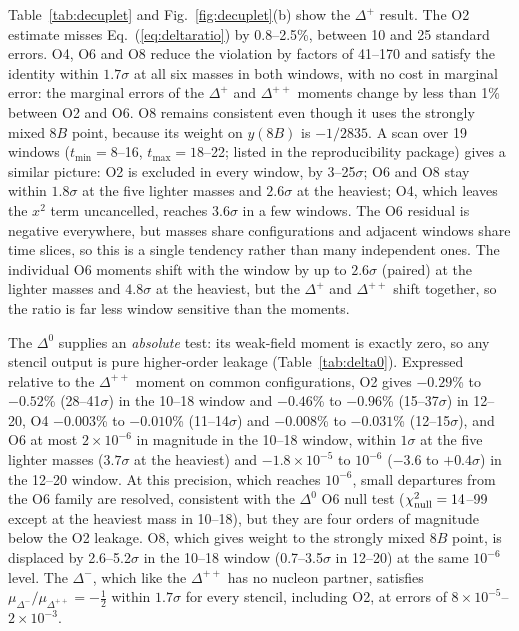 \documentclass[aps,prd,preprint,nofootinbib,floatfix]{revtex4-2}
\begin{document}
Table~\ref{tab:decuplet} and Fig.~\ref{fig:decuplet}(b) show the $\Delta^+$ result. The O2 estimate misses Eq.~(\ref{eq:deltaratio}) by 0.8--2.5\%, between 10 and 25 standard errors. O4, O6 and O8 reduce the violation by factors of 41--170 and satisfy the identity within $1.7\sigma$ at all six masses in both windows, with no cost in marginal error: the marginal errors of the $\Delta^+$ and $\Delta^{++}$ moments change by less than 1\% between O2 and O6. O8 remains consistent even though it uses the strongly mixed $8B$ point, because its weight on $y(8B)$ is $-1/2835$. A scan over 19 windows ($t_{\min}=8$--16, $t_{\max}=18$--22; listed in the reproducibility package) gives a similar picture: O2 is excluded in every window, by 3--25$\sigma$; O6 and O8 stay within $1.8\sigma$ at the five lighter masses and $2.6\sigma$ at the heaviest; O4, which leaves the $x^2$ term uncancelled, reaches $3.6\sigma$ in a few windows. The O6 residual is negative everywhere, but masses share configurations and adjacent windows share time slices, so this is a single tendency rather than many independent ones. The individual O6 moments shift with the window by up to $2.6\sigma$ (paired) at the lighter masses and $4.8\sigma$ at the heaviest, but the $\Delta^+$ and $\Delta^{++}$ shift together, so the ratio is far less window sensitive than the moments.

The $\Delta^0$ supplies an \emph{absolute} test: its weak-field moment is exactly zero, so any stencil output is pure higher-order leakage (Table~\ref{tab:delta0}). Expressed relative to the $\Delta^{++}$ moment on common configurations, O2 gives $-0.29$\% to $-0.52$\% (28--41$\sigma$) in the 10--18 window and $-0.46$\% to $-0.96$\% (15--37$\sigma$) in 12--20, O4 $-0.003$\% to $-0.010$\% (11--14$\sigma$) and $-0.008$\% to $-0.031$\% (12--15$\sigma$), and O6 at most $2\times10^{-6}$ in magnitude in the 10--18 window, within $1\sigma$ at the five lighter masses ($3.7\sigma$ at the heaviest) and $-1.8\times10^{-5}$ to $10^{-6}$ ($-3.6$ to $+0.4\sigma$) in the 12--20 window. At this precision, which reaches $10^{-6}$, small departures from the O6 family are resolved, consistent with the $\Delta^0$ O6 null test ($\chi^2_{\rm null}=14$--99 except at the heaviest mass in 10--18), but they are four orders of magnitude below the O2 leakage. O8, which gives weight to the strongly mixed $8B$ point, is displaced by 2.6--5.2$\sigma$ in the 10--18 window (0.7--3.5$\sigma$ in 12--20) at the same $10^{-6}$ level. The $\Delta^-$, which like the $\Delta^{++}$ has no nucleon partner, satisfies $\mu_{\Delta^-}/\mu_{\Delta^{++}}=-\tfrac12$ within $1.7\sigma$ for every stencil, including O2, at errors of $8\times10^{-5}$--$2\times10^{-3}$.
\end{document}
